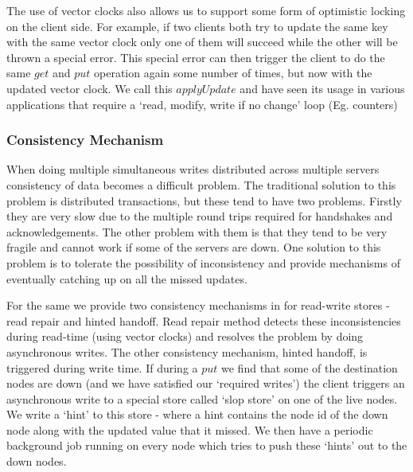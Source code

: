 \documentclass[10pt,twocolumn,preprint,nonatbib,numbers]{sigplanconf}
\begin{document}
The use of vector clocks also allows us to support some form of optimistic locking on the client side. For example, if two clients both try to update the same key with the same vector clock only one of them will succeed while the other will be thrown a special error. This special error can then trigger the client to do the same $get$ and $put$ operation again some number of times, but now with the updated vector clock. We call this $applyUpdate$ and have seen its usage in various applications that require a `read, modify, write if no change' loop (Eg. counters)


\subsubsection {Consistency Mechanism }
\label{sec:system_architecture:system_components:consistency_mechanism}

When doing multiple simultaneous writes distributed across multiple servers consistency of data becomes a difficult problem. The traditional solution to this problem is distributed transactions, but these tend to have two problems. Firstly they are very slow due to the multiple round trips required for handshakes and acknowledgements. The other problem with them is that they tend to be very fragile and cannot work if some of the servers are down. One solution to this problem is to tolerate the possibility of inconsistency and provide mechanisms of eventually catching up on all the missed updates. 

For the same we provide two consistency mechanisms in \projectname{} for read-write stores - read repair and hinted handoff. Read repair method detects these inconsistencies during read-time (using vector clocks) and resolves the problem by doing asynchronous writes. The other consistency mechanism, hinted handoff, is triggered during write time. If during a $put$ we find that some of the destination nodes are down (and we have satisfied our `required writes') the client triggers an asynchronous write to a special store called `slop store' on one of the live nodes. We write a `hint' to this store - where a hint contains the node id of the down node along with the updated value that it missed. We then have a periodic background job running on every node which tries to push these `hints' out to the down nodes.
\end{document}
